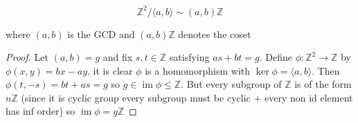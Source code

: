 \documentclass[11pt,largemargins]{homework}
\newcommand{\Z}{\mathbb{Z}}
\newcommand{\im}{\operatorname{im}}
\begin{document}
\maketitle

\question
\[\Z^2 / \langle a, b \rangle \sim (a, b)\Z \] 

where $(a, b)$ is the GCD and $(a,b)\Z $ denotes the coset 

\begin{proof}
    Let $(a, b) = g$ and fix $s, t \in \Z$ satisfying $as + bt = g$. Define $\phi: \Z^2 \to \Z$ by 
    $\phi(x,y) = bx - ay$. it is clear $\phi$ is a homomorphism with $\ker \phi = \langle a, b \rangle $.
    Then $\phi(t, -s) = bt + as = g$ so $g \in \im \phi \leq \Z$. But every subgroup of $\Z$ is of the form $n \Z$ (since 
    it is cyclic group every subgroup must be cyclic + every non id element has inf order) so $\im \phi = g \Z$
\end{proof}
\end{document}

